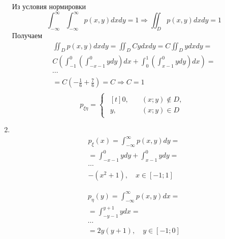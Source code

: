 \documentclass[12pt]{article}
\begin{document}
\begin{enumerate}
	      Из условия нормировки
	      \begin{equation*}
		      \int_{-\infty}^{\infty}\int_{-\infty}^{\infty}p(x,y)dxdy = 1 \Rightarrow \iint_{D}p(x,y)dxdy = 1
	      \end{equation*}
	      Получаем
	      \begin{gather*}
		      \iint_{D}p(x,y)dxdy = \iint_{D}Cydxdy = C\iint_{D}ydxdy = \\
		      C \left( \int_{-1}^{0}\left(\int_{-x-1}^{0}ydy\right)dx + \int_{0}^{1}\left(\int_{x-1}^{0}ydy\right)dx \right) = \\
		      \cdots \\
		      = C \left(-\frac{1}{6} + \frac{7}{6}\right) = C \Rightarrow C = 1 \\
	      \end{gather*}
	      \begin{equation*}
		      p_{\xi\eta} =
		      \begin{cases}
			      \begin{aligned}[t]
				      0, & \quad (x;y) \notin D, \\
				      y, & \quad (x;y) \in D
			      \end{aligned}
		      \end{cases}
	      \end{equation*}

	\item \mbox{}\\
	      \begin{gather*}
		      p_\xi(x) = \int_{-\infty}^{\infty}p(x,y)dy = \\
		      = \int_{-x-1}^{0}ydy + \int_{x-1}^{0}ydy = \\
		      \cdots \\
		      -(x^2 + 1), \quad x \in [-1; 1]
	      \end{gather*}

	      \begin{gather*}
		      p_\eta(y) = \int_{-\infty}^{\infty}p(x,y)dx = \\
		      = \int_{-y-1}^{y+1}ydx = \\
		      \cdots \\
		      = 2y(y + 1), \quad y \in [-1; 0]
	      \end{gather*}


\end{enumerate}
\end{document}
